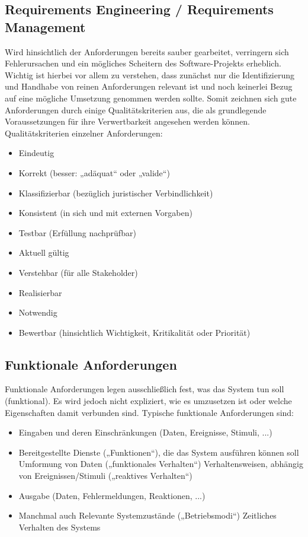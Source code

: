 \subsection{Requirements Engineering / Requirements Management}
Wird hinsichtlich der Anforderungen bereits sauber gearbeitet, verringern sich Fehlerursachen und ein mögliches Scheitern des Software-Projekts erheblich. Wichtig ist hierbei vor allem zu verstehen, dass zunächst nur die Identifizierung und Handhabe von reinen Anforderungen relevant ist und noch keinerlei Bezug auf eine mögliche Umsetzung genommen werden sollte. Somit zeichnen sich gute Anforderungen durch einige Qualitätskriterien aus, die als grundlegende Voraussetzungen für ihre Verwertbarkeit angesehen werden können. 
\\
Qualitätskriterien einzelner Anforderungen:
\\
\begin{itemize}
	\item Eindeutig
	\item Korrekt (besser: „adäquat“ oder „valide“)
	\item Klassifizierbar (bezüglich juristischer Verbindlichkeit)
	\item Konsistent (in sich und mit externen Vorgaben)
	\item Testbar (Erfüllung nachprüfbar)
	\item Aktuell gültig
	\item Verstehbar (für alle Stakeholder)
	\item Realisierbar
	\item Notwendig
	\item Bewertbar (hinsichtlich Wichtigkeit, Kritikalität oder Priorität)
\end{itemize}

\cite{partsch-re}

\subsection{Funktionale Anforderungen}
Funktionale Anforderungen legen ausschließlich fest, was das System tun soll (funktional). Es wird jedoch nicht expliziert, wie es umzusetzen ist oder welche Eigenschaften damit verbunden sind. Typische funktionale Anforderungen sind:
\begin{itemize}
	\item Eingaben und deren Einschränkungen (Daten, Ereignisse, Stimuli, ...)
	\item Bereitgestellte Dienste („Funktionen“), die das System ausführen können soll
	\subitem Umformung von Daten („funktionales Verhalten“)
	\subitem Verhaltensweisen, abhängig von Ereignissen/Stimuli („reaktives Verhalten“)
	\item Ausgabe (Daten, Fehlermeldungen, Reaktionen, ...)
	\item 	Manchmal auch
	\subitem Relevante Systemzustände („Betriebsmodi“)
	\subitem Zeitliches Verhalten des Systems
\end{itemize}

